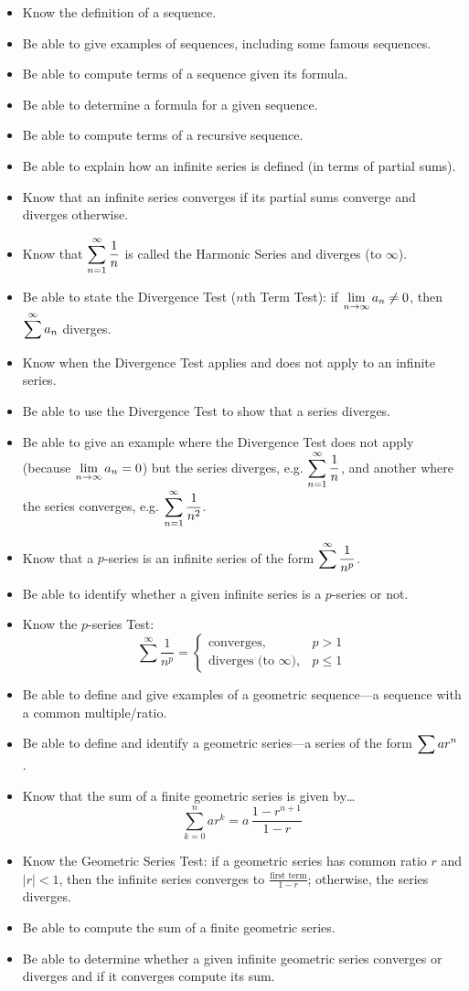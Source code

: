 \documentclass[11pt,letterpaper]{article}
\begin{document}
\begin{itemize}
\item Know the definition of a sequence.
\item Be able to give examples of sequences, including some famous sequences.
\item Be able to compute terms of a sequence given its formula. 
\item Be able to determine a formula for a given sequence. 
\item Be able to compute terms of a recursive sequence. 
\item Be able to explain how an infinite series is defined (in terms of partial sums). 
\item Know that an infinite series converges if its partial sums converge and diverges otherwise.
\item Know that $\displaystyle\sum_{n=1}^\infty \dfrac{1}{n}$ is called the Harmonic Series and diverges (to $\infty$).
\item Be able to state the Divergence Test ($n$th Term Test): if $\displaystyle\lim_{n \to \infty} a_n \neq 0$, then $\displaystyle\sum^\infty a_n$ diverges. 
\item Know when the Divergence Test applies and does not apply to an infinite series. 
\item Be able to use the Divergence Test to show that a series diverges.
\item Be able to give an example where the Divergence Test does not apply (because $\displaystyle\lim_{n \to \infty} a_n= 0$) but the series diverges, e.g. $\displaystyle\sum_{n=1}^\infty \dfrac{1}{n}$, and another where the series converges, e.g. $\displaystyle\sum_{n=1}^\infty \dfrac{1}{n^2}$.
\item Know that a $p$-series is an infinite series of the form $\displaystyle\sum^\infty \dfrac{1}{n^p}$. 
\item Be able to identify whether a given infinite series is a $p$-series or not. 
\item Know the $p$-series Test:
	\[
	\sum^\infty \dfrac{1}{n^p}= \begin{cases} \text{converges}, & p > 1 \\ \text{diverges (to } \infty \text{)}, & p \leq 1 \end{cases}
	\]
\item Be able to define and give examples of a geometric sequence---a sequence with a common multiple/ratio.
\item Be able to define and identify a geometric series---a series of the form $\displaystyle\sum a r^n$. 
\item Know that the sum of a finite geometric series is given by\dots
	\[
	\sum_{k=0}^n a r^k= a \, \dfrac{1 - r^{n+1}}{1 - r}
	\]
\item Know the Geometric Series Test: if a geometric series has common ratio $r$ and $|r| < 1$, then the infinite series converges to $\frac{\text{first term}}{1 - r}$; otherwise, the series diverges. 
\item Be able to compute the sum of a finite geometric series. 
\item Be able to determine whether a given infinite geometric series converges or diverges and if it converges compute its sum. 
\end{itemize}
\end{document}
